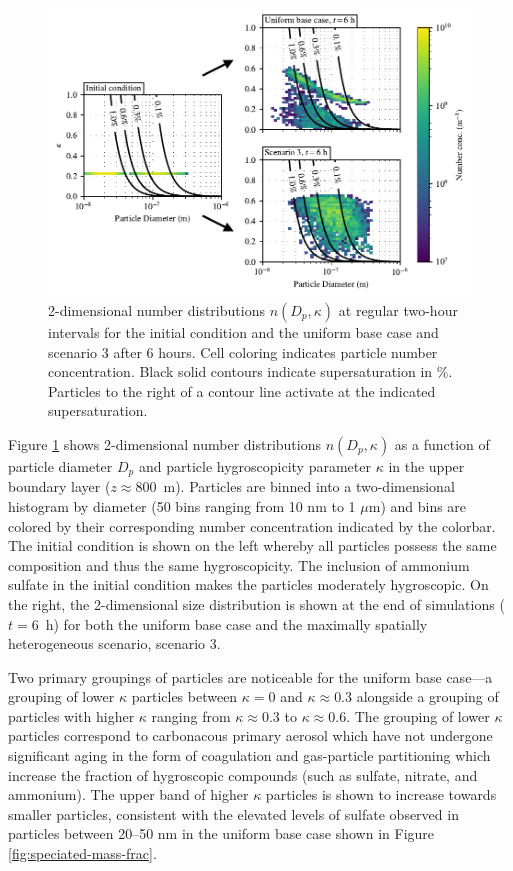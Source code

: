 \documentclass[journal abbreviation, manuscript]{copernicus}
\begin{document}
\begin{figure}[!t]
	\centering
	\includegraphics[]{figures/2d-kappa-dist-three-panel-z40.pdf}
	\caption{2-dimensional number distributions $n(D_p, \kappa)$ at regular two-hour intervals for the initial condition and the uniform base case and scenario 3 after 6 hours. Cell coloring indicates particle number concentration. Black solid contours indicate supersaturation in $\%$. Particles to the right of a contour line activate at the indicated supersaturation.}
	\label{fig:kappa-dist}
\end{figure} 

Figure \ref{fig:kappa-dist} shows 2-dimensional number distributions $n(D_p, \kappa)$ as a function of particle diameter $D_p$ and particle hygroscopicity parameter $\kappa$ in the upper boundary layer ($z\approx 800$~m). Particles are binned into a two-dimensional histogram by diameter (50 bins ranging from 10 nm to 1 $\mu$m) and bins are colored by their corresponding number concentration indicated by the colorbar. The initial condition is shown on the left whereby all particles possess the same composition and thus the same hygroscopicity. The inclusion of ammonium sulfate in the initial condition makes the particles moderately hygroscopic. On the right, the 2-dimensional size distribution is shown at the end of simulations ($t=6$~h) for both the uniform base case and the maximally spatially heterogeneous scenario, scenario 3. 

Two primary groupings of particles are noticeable for the uniform base case---a grouping of lower $\kappa$ particles between $\kappa=0$ and $\kappa\approx0.3$ alongside a grouping of particles with higher $\kappa$ ranging from $\kappa\approx0.3$ to $\kappa\approx0.6$. The grouping of lower $\kappa$ particles correspond to carbonacous primary aerosol which have not undergone significant aging in the form of coagulation and gas-particle partitioning which increase the fraction of hygroscopic compounds (such as sulfate, nitrate, and ammonium). The upper band of higher $\kappa$ particles is shown to increase towards smaller particles, consistent with the elevated levels of sulfate observed in particles between 20--50 nm in the uniform base case shown in Figure \ref{fig:speciated-mass-frac}.
\end{document}
